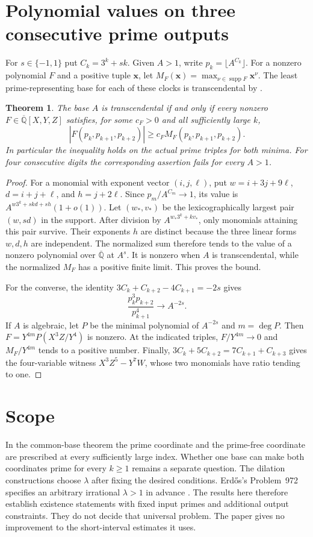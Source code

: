 \documentclass[11pt]{article}
\newtheorem{theorem}{Theorem}
\theoremstyle{remark}\newtheorem*{remark}{Remark}
\begin{document}
\section{Polynomial values on three consecutive prime outputs}
For $s\in\{-1,1\}$ put $C_k=3^k+sk$. Given $A>1$, write
$p_k=\lfloor A^{C_k}\rfloor$. For a nonzero polynomial $F$ and a
positive tuple $\mathbf x$, let
$M_F(\mathbf x)=\max_{\nu\in\operatorname{supp} F}\mathbf x^\nu$.
The least prime-representing base for each of these clocks is
transcendental by \cite{corpus8}.

\begin{theorem}\label{thm:three-prime-separation}
The base $A$ is transcendental if and only if every nonzero
$F\in\overline{\mathbb Q}[X,Y,Z]$ satisfies, for some $c_F>0$ and all
sufficiently large $k$,
\[
 |F(p_k,p_{k+1},p_{k+2})|\ge c_F M_F(p_k,p_{k+1},p_{k+2}).
\]
In particular the inequality holds on the actual prime triples for
both minima. For four consecutive digits the corresponding assertion
fails for every $A>1$.
\end{theorem}
\begin{proof}
For a monomial with exponent vector $(i,j,\ell)$, put
$w=i+3j+9\ell$, $d=i+j+\ell$, and $h=j+2\ell$.
Since $p_m/A^{C_m}\to1$, its value is
$A^{w3^k+skd+sh}(1+o(1))$. Let $(w_*,v_*)$ be the lexicographically
largest pair $(w,sd)$ in the support. After division by
$A^{w_*3^k+kv_*}$, only monomials attaining this pair survive.
Their exponents $h$ are distinct because the three linear forms
$w,d,h$ are independent. The normalized sum therefore tends to the
value of a nonzero polynomial over $\overline{\mathbb Q}$ at $A^s$.
It is nonzero when $A$ is transcendental, while the normalized
$M_F$ has a positive finite limit. This proves the bound.

For the converse, the identity $3C_k+C_{k+2}-4C_{k+1}=-2s$ gives
\[
 \frac{p_k^3p_{k+2}}{p_{k+1}^4}\longrightarrow A^{-2s}.
\]
If $A$ is algebraic, let $P$ be the minimal polynomial of $A^{-2s}$
and $m=\deg P$. Then $F=Y^{4m}P(X^3Z/Y^4)$ is nonzero.
At the indicated triples, $F/Y^{4m}\to0$ and $M_F/Y^{4m}$ tends
to a positive number. Finally,
$3C_k+5C_{k+2}=7C_{k+1}+C_{k+3}$ gives the four-variable witness
$X^3Z^5-Y^7W$, whose two monomials have ratio tending to one.
\end{proof}

\section*{Scope}
In the common-base theorem the prime coordinate and the prime-free coordinate
are prescribed at every sufficiently large index. Whether one base can make
both coordinates prime for every $k\ge1$ remains a separate question.
The dilation constructions choose $\lambda$ after fixing the desired
conditions. Erd\H os's Problem~972 specifies an arbitrary irrational
$\lambda>1$ in advance \cite{erdos}. The results here therefore establish
existence statements with fixed input primes and additional output constraints.
They do not decide that universal problem. The paper gives no improvement
to the short-interval estimates it uses.
\end{document}
